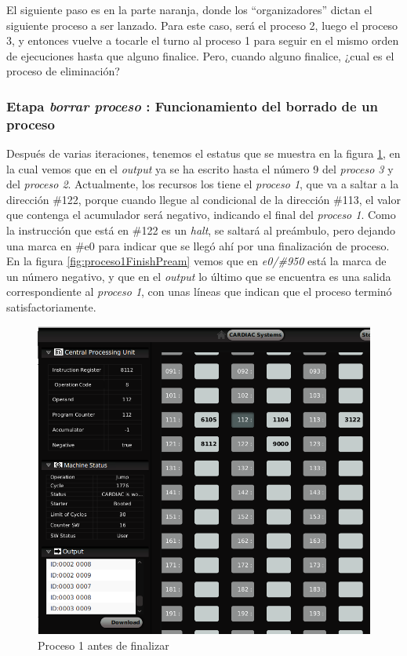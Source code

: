 \documentclass[letterpaper,12pt,oneside]{book}
\begin{document}
		
		El siguiente paso es en la parte naranja, donde los ``organizadores'' dictan el siguiente proceso a ser lanzado. Para este caso, será el 
		proceso 2, luego
		el proceso 3, y entonces vuelve a tocarle el turno al proceso 1 para seguir en el mismo orden de ejecuciones hasta que alguno finalice. Pero,
		cuando alguno finalice, ¿cual es el proceso de eliminación?
		
		
		\subsubsection{Etapa \textit{borrar proceso} : Funcionamiento del borrado de un proceso}
		
		Después de varias iteraciones, tenemos el estatus que se muestra en la figura \ref{fig:proceso1BeforeFinish}, en la cual vemos que en el
		\textit{output} ya se ha escrito hasta el número 9 del \textit{proceso 3} y del \textit{proceso 2}. Actualmente, los 
		recursos los tiene el \textit{proceso 1}, que va a saltar a la dirección \#122, porque cuando llegue al condicional de la dirección
		\#113, el valor que contenga el acumulador será negativo, indicando el final del \textit{proceso 1}. Como la instrucción 
		que está en \#122 es un \textit{halt}, se saltará
		al preámbulo, pero dejando una marca en \#e0 para indicar que se llegó ahí por una finalización de proceso. En la figura 
		\ref{fig:proceso1FinishPream}
		vemos que en \textit{e0/\#950} está la marca de un número negativo, y que en el \textit{output} lo último que se encuentra es una salida 
		correspondiente al
		\textit{proceso 1}, con unas líneas que indican que el proceso terminó satisfactoriamente.
		
		\begin{figure}[h]		
			\centering
			\includegraphics[scale=0.67]{media/CARDIACC/proceso1BeforeFinish_cutted.png}
			\caption{ Proceso 1 antes de finalizar }
			\label{fig:proceso1BeforeFinish}
		\end{figure}
		
\end{document}
